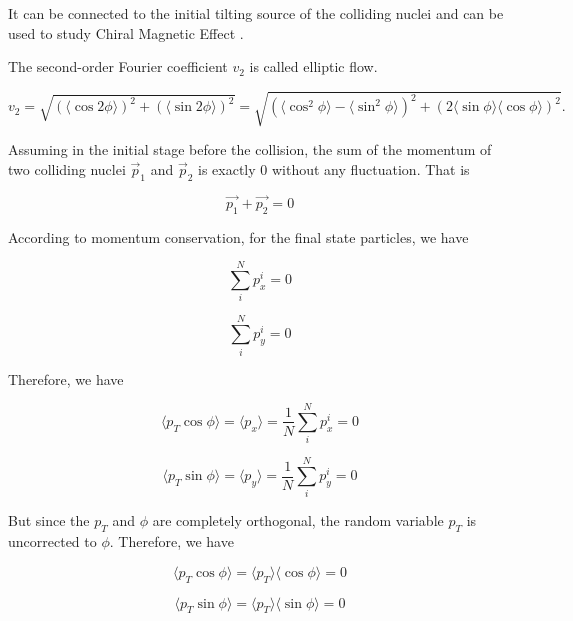 It can be connected to the initial tilting source of the colliding nuclei \cite{V1Tilted} and can be used to study Chiral Magnetic Effect \cite{V1CME}. 

The second-order Fourier coefficient $v_2$ is called elliptic flow. 

\begin{equation}
v_2 =  \sqrt{(\langle \cos 2\phi \rangle)^2+(\langle \sin 2\phi \rangle)^2} =  \sqrt{(\langle \cos^2 \phi \rangle - \langle \sin^2 \phi \rangle)^2 + (2  \langle \sin \phi \rangle \langle \cos \phi \rangle)^2}. 
\end{equation}

Assuming in the initial stage before the collision, the sum of the momentum of two colliding nuclei $\vec p_1$ and $\vec p_2$ is exactly 0 without any fluctuation. That is

\begin{equation}
\vec{p_1} + \vec{p_2} = 0
\end{equation}

According to momentum conservation, for the final state particles, we have 

\begin{equation}
\sum_i^N p_x^i = 0
\end{equation}

\begin{equation}
\sum_i^N p_y^i = 0
\end{equation}

Therefore, we have

\begin{equation}
\langle p_T \cos \phi \rangle = \langle p_x \rangle = \frac{1}{N} \sum_i^N p_x^i   = 0
\end{equation}

\begin{equation}
\langle p_T \sin \phi \rangle = \langle p_y \rangle =  \frac{1}{N} \sum_i^N p_y^i  = 0
\end{equation}
 
But since the $p_T$ and $\phi$ are completely orthogonal, the random variable $p_T$ is uncorrected to $\phi$. Therefore, we have 
 
\begin{equation}
\langle p_T \cos \phi \rangle =  \langle p_T \rangle \langle  \cos \phi \rangle = 0
\end{equation}

\begin{equation}
\langle p_T \sin \phi \rangle =  \langle p_T \rangle \langle  \sin \phi \rangle = 0
\end{equation}

